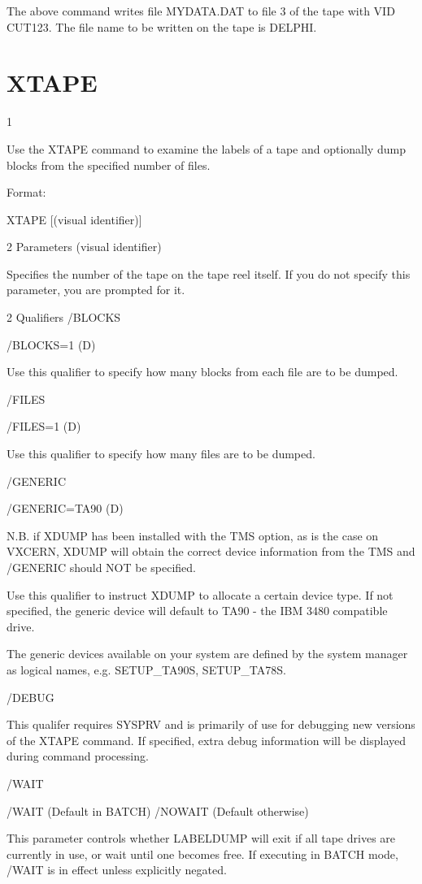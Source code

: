 \begin{XMP}
The above command writes file MYDATA.DAT to file 3 of the tape with VID CUT123.
The file name to be written on the tape is DELPHI.
\section{XTAPE}
1 

  Use the XTAPE command to examine the labels of a tape and optionally
  dump blocks from the specified number of files.


   Format:

   XTAPE [(visual identifier)]

2 Parameters
  (visual identifier)

  Specifies the number of the tape on the tape reel itself.
  If you do not specify this parameter, you are prompted for it.

2 Qualifiers
/BLOCKS

   /BLOCKS=1 (D)

  Use this qualifier to specify how many blocks from each file are to be
  dumped.

/FILES

   /FILES=1 (D)

 Use this qualifier to specify how many files are to be dumped.

/GENERIC

   /GENERIC=TA90 (D)

 N.B. if XDUMP has been installed with the TMS option,
 as is the case on VXCERN, XDUMP will obtain the correct
 device information from the TMS and /GENERIC should NOT be specified.

 Use this qualifier to instruct XDUMP to allocate a certain
 device type. If not specified, the generic device will default to
 TA90 - the IBM 3480 compatible drive.

 The generic devices available on your system are defined by the system
 manager as logical names, e.g. SETUP_TA90S, SETUP_TA78S.

/DEBUG

 This qualifer requires SYSPRV and is primarily of use for debugging
 new versions of the XTAPE command. If specified, extra debug information
 will be displayed during command processing.

/WAIT

   /WAIT     (Default in BATCH)
   /NOWAIT   (Default otherwise)

  This parameter controls whether LABELDUMP will exit if all tape drives
  are currently in use, or wait until one becomes free. If executing
  in BATCH mode, /WAIT is in effect unless explicitly negated.

\end{XMP}
